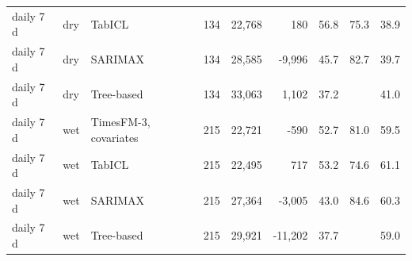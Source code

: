 \begin{tabular}{lllrrrrrr}
daily 7 d & dry & TabICL & 134 & 22,768 & 180 & 56.8 & 75.3 & 38.9 \\
daily 7 d & dry & SARIMAX & 134 & 28,585 & -9,996 & 45.7 & 82.7 & 39.7 \\
daily 7 d & dry & Tree-based & 134 & 33,063 & 1,102 & 37.2 &  & 41.0 \\
daily 7 d & wet & TimesFM-3, covariates & 215 & 22,721 & -590 & 52.7 & 81.0 & 59.5 \\
daily 7 d & wet & TabICL & 215 & 22,495 & 717 & 53.2 & 74.6 & 61.1 \\
daily 7 d & wet & SARIMAX & 215 & 27,364 & -3,005 & 43.0 & 84.6 & 60.3 \\
daily 7 d & wet & Tree-based & 215 & 29,921 & -11,202 & 37.7 &  & 59.0 \\
\bottomrule
\end{tabular}
